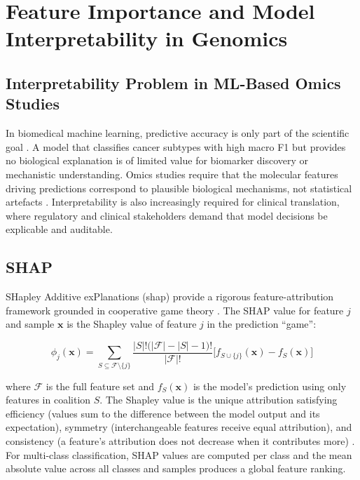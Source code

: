 \section{Feature Importance and Model Interpretability in Genomics}

\subsection{Interpretability Problem in ML-Based Omics Studies}
 
In biomedical machine learning, predictive accuracy is only part of the scientific goal \parencite{Janssen2024}. A model that classifies cancer subtypes with high macro F1 but provides no biological explanation is of limited value for biomarker discovery or mechanistic understanding. Omics studies require that the molecular features driving predictions correspond to plausible biological mechanisms, not statistical artefacts \parencite{Janssen2024}. Interpretability is also increasingly required for clinical translation, where regulatory and clinical stakeholders demand that model decisions be explicable and auditable.
 
\subsection{SHAP}
 
SHapley Additive exPlanations (\gls{shap}) provide a rigorous feature-attribution framework grounded in cooperative game theory \parencite{Lundberg2017}. The SHAP value for feature $j$ and sample $\mathbf{x}$ is the Shapley value of feature $j$ in the prediction ``game'':
 
\begin{equation}
\phi_j(\mathbf{x}) = \sum_{S \subseteq \mathcal{F} \setminus \{j\}}
    \frac{|S|!\bigl(|\mathcal{F}| - |S| - 1\bigr)!}{|\mathcal{F}|!}
    \bigl[f_{S \cup \{j\}}(\mathbf{x}) - f_S(\mathbf{x})\bigr]
\label{eq:shap_value}
\end{equation}
 
where $\mathcal{F}$ is the full feature set and $f_S(\mathbf{x})$ is the model's prediction using only features in coalition $S$. The Shapley value is the unique attribution satisfying efficiency (values sum to the difference between the model output and its expectation), symmetry (interchangeable features receive equal attribution), and consistency (a feature's attribution does not decrease when it contributes more) \parencite{Lundberg2017}. For multi-class classification, SHAP values are computed per class and the mean absolute value across all classes and samples produces a global feature ranking.
 
